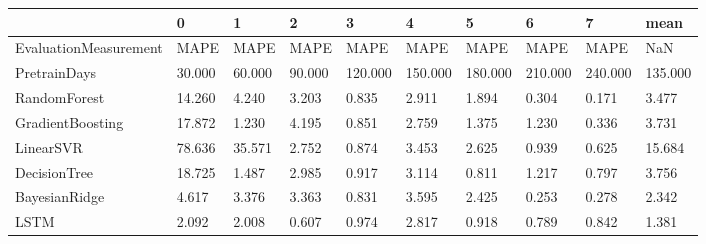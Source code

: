 \begin{tabular}{llllllllll}
\toprule
{} &      0 &      1 &      2 &       3 &       4 &       5 &       6 &       7 &    mean \\
\midrule
EvaluationMeasurement &   MAPE &   MAPE &   MAPE &    MAPE &    MAPE &    MAPE &    MAPE &    MAPE &     NaN \\
PretrainDays          & 30.000 & 60.000 & 90.000 & 120.000 & 150.000 & 180.000 & 210.000 & 240.000 & 135.000 \\
RandomForest          & 14.260 &  4.240 &  3.203 &   0.835 &   2.911 &   1.894 &   0.304 &   0.171 &   3.477 \\
GradientBoosting      & 17.872 &  1.230 &  4.195 &   0.851 &   2.759 &   1.375 &   1.230 &   0.336 &   3.731 \\
LinearSVR             & 78.636 & 35.571 &  2.752 &   0.874 &   3.453 &   2.625 &   0.939 &   0.625 &  15.684 \\
DecisionTree          & 18.725 &  1.487 &  2.985 &   0.917 &   3.114 &   0.811 &   1.217 &   0.797 &   3.756 \\
BayesianRidge         &  4.617 &  3.376 &  3.363 &   0.831 &   3.595 &   2.425 &   0.253 &   0.278 &   2.342 \\
LSTM                  &  2.092 &  2.008 &  0.607 &   0.974 &   2.817 &   0.918 &   0.789 &   0.842 &   1.381 \\
\bottomrule
\end{tabular}
